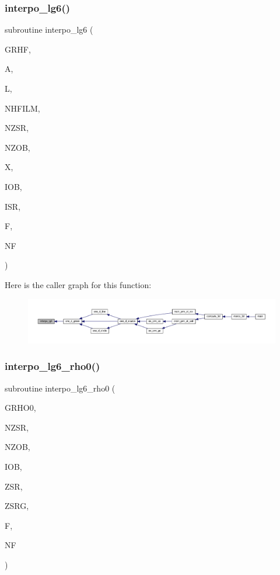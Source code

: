 \subsubsection{\texorpdfstring{interpo\+\_\+lg6()}{interpo\_lg6()}}
{\footnotesize\ttfamily subroutine interpo\+\_\+lg6 (\begin{DoxyParamCaption}\item[{complex, dimension(11,nhfilm,nzsr,nzob)}]{G\+R\+HF,  }\item[{real, dimension(l)}]{A,  }\item[{integer}]{L,  }\item[{integer}]{N\+H\+F\+I\+LM,  }\item[{integer}]{N\+Z\+SR,  }\item[{integer}]{N\+Z\+OB,  }\item[{real}]{X,  }\item[{integer}]{I\+OB,  }\item[{integer}]{I\+SR,  }\item[{complex, dimension(nf)}]{F,  }\item[{integer}]{NF }\end{DoxyParamCaption})}

Here is the caller graph for this function\+:
\nopagebreak
\begin{figure}[H]
\begin{center}
\leavevmode
\includegraphics[width=350pt]{Marco_8f90_a5fa32081a6f961179118c3eed68de85f_icgraph}
\end{center}
\end{figure}
\mbox{\label{Marco_8f90_a26481105d1de3f776fc36a094d319fbb}} 
\subsubsection{\texorpdfstring{interpo\+\_\+lg6\+\_\+rho0()}{interpo\_lg6\_rho0()}}
{\footnotesize\ttfamily subroutine interpo\+\_\+lg6\+\_\+rho0 (\begin{DoxyParamCaption}\item[{complex, dimension(4,nzsr,nzob)}]{G\+R\+H\+O0,  }\item[{integer}]{N\+Z\+SR,  }\item[{integer}]{N\+Z\+OB,  }\item[{integer}]{I\+OB,  }\item[{real}]{Z\+SR,  }\item[{real, dimension(2,nzsr)}]{Z\+S\+RG,  }\item[{complex, dimension(nf)}]{F,  }\item[{integer}]{NF }\end{DoxyParamCaption})}

